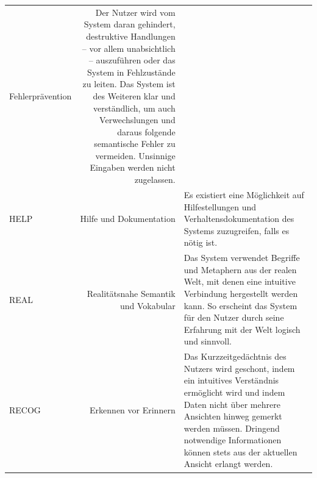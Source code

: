 \documentclass[
  12pt,
  ngerman,
  a4paper,
]{article}
\begin{document}
\begin{longtable}[]{@{}lrl@{}}
\begin{minipage}[t]{0.25\columnwidth}
Fehlerprävention\strut
\end{minipage} & \begin{minipage}[t]{0.58\columnwidth}\raggedright
Der Nutzer wird vom System daran gehindert, destruktive Handlungen --
vor allem unabsichtlich -- auszuführen oder das System in Fehlzustände
zu leiten. Das System ist des Weiteren klar und verständlich, um auch
Verwechslungen und daraus folgende semantische Fehler zu vermeiden.
Unsinnige Eingaben werden nicht zugelassen.\strut
\end{minipage}\tabularnewline
\begin{minipage}[t]{0.09\columnwidth}\raggedright
HELP\strut
\end{minipage} & \begin{minipage}[t]{0.25\columnwidth}\raggedleft
Hilfe und Dokumentation\strut
\end{minipage} & \begin{minipage}[t]{0.58\columnwidth}\raggedright
Es existiert eine Möglichkeit auf Hilfestellungen und
Verhaltensdokumentation des Systems zuzugreifen, falls es nötig
ist.\strut
\end{minipage}\tabularnewline
\begin{minipage}[t]{0.09\columnwidth}\raggedright
REAL\strut
\end{minipage} & \begin{minipage}[t]{0.25\columnwidth}\raggedleft
Realitätsnahe Semantik und Vokabular\strut
\end{minipage} & \begin{minipage}[t]{0.58\columnwidth}\raggedright
Das System verwendet Begriffe und Metaphern aus der realen Welt, mit
denen eine intuitive Verbindung hergestellt werden kann. So erscheint
das System für den Nutzer durch seine Erfahrung mit der Welt logisch und
sinnvoll.\strut
\end{minipage}\tabularnewline
\begin{minipage}[t]{0.09\columnwidth}\raggedright
RECOG\strut
\end{minipage} & \begin{minipage}[t]{0.25\columnwidth}\raggedleft
Erkennen vor Erinnern\strut
\end{minipage} & \begin{minipage}[t]{0.58\columnwidth}\raggedright
Das Kurzzeitgedächtnis des Nutzers wird geschont, indem ein intuitives
Verständnis ermöglicht wird und indem Daten nicht über mehrere Ansichten
hinweg gemerkt werden müssen. Dringend notwendige Informationen können
stets aus der aktuellen Ansicht erlangt werden.\strut

\end{minipage}
\end{longtable}
\end{document}
